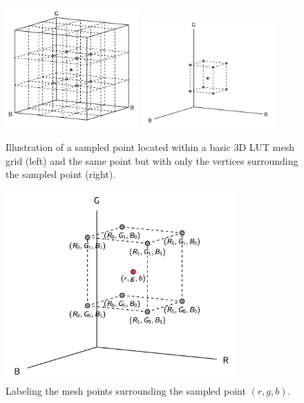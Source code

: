 \begin{figure}[htbp]
\begin{center}
    \includegraphics[width=2in]{images/interp-pointInMesh.png}
    \includegraphics[width=2in]{images/interp-pointInCubelet.png}
\caption{Illustration of a sampled point located within a basic 3D LUT mesh grid (left) and the same point but with only the vertices surrounding the sampled point (right).}
\label{fig:lut-sampling}
\end{center}
\end{figure}

\begin{figure}[htbp]
\begin{center}
    \includegraphics[width=3.5in]{images/interp-labeledCubelet.png}
\caption{Labeling the mesh points surrounding the sampled point $(r,g,b)$.}
\label{fig:mesh-points}
\end{center}
\end{figure}

